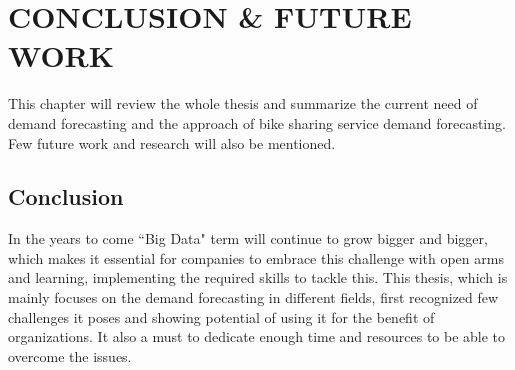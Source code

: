 %
%
%


\chapter{\uppercase { Conclusion \& Future work}}

\label{Conclusion}

This chapter will review the whole thesis and summarize the current need of demand forecasting and the approach of bike sharing service demand forecasting. Few future work and research will also be mentioned. 


\section {Conclusion}
\label{conclusion}

In the years to come ``Big Data" term will continue to grow bigger and bigger, which makes it essential for companies to embrace this challenge with open arms and learning, implementing the required skills to tackle this. This thesis, which is mainly focuses on the demand forecasting in different fields, first recognized few challenges it poses and showing potential of using it for the benefit of organizations. It also a must to dedicate enough time and resources to be able to overcome the issues. 




